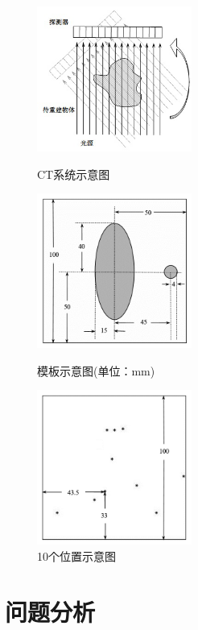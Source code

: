 \documentclass[UTF8]{ctexart}
\begin{document}
\begin{center}
\begin{figure}[htbp]
\centering
\begin{minipage}[t]{0.3\textwidth}
  \includegraphics[width=2in]{../figure/problem_1.png}
  \caption{CT系统示意图}
  \label{fig:problem_1}
\end{minipage}
\begin{minipage}[t]{0.3\textwidth}
  \includegraphics[width=2in]{../figure/problem_2.png}
  \caption{模板示意图(单位：mm)}
  \label{fig:problem_2}
\end{minipage}
\begin{minipage}[t]{0.3\textwidth}
  \includegraphics[width=2in]{../figure/problem_3.png}
  \caption{10个位置示意图}
  \label{fig:problem_3}
\end{minipage}
\end{figure}
\end{center}



\section{问题分析}
\end{document}
